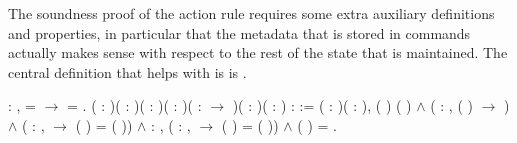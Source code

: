 \documentclass[12pt]{report}
\begin{document}
 The soundness proof of the action rule requires some
    extra auxiliary definitions and properties, in particular
    that the metadata that is stored in  commands
    actually makes sense with respect to the rest of the
    state that is maintained. The central definition that helps
    with is is . \begin{coqdoccode}
\coqdocemptyline
\coqdocnoindent
{}  :\coqdoceol
\coqdocindent{1.00em}
\coqdockw{\ensuremath{\forall}} ,   =  \ensuremath{\rightarrow}   = .\coqdoceol
 \coqdocemptyline
\coqdocnoindent
{}  ( : )( : )( : )( :  )( :  \ensuremath{\rightarrow} )(  : )( : ) :  :=\coqdoceol
\coqdocindent{1.00em}
\coqdoceol
\coqdocindent{1.00em}
\coqdoctac{\ensuremath{\exists}} ( : )( : ),\coqdoceol
\coqdocindent{2.00em}
 ( ) (    ) \ensuremath{\land}\coqdoceol
\coqdocindent{1.00em}
\coqdoceol
\coqdocindent{2.00em}
(\coqdockw{\ensuremath{\forall}}  : ,   (  ) \ensuremath{\rightarrow}   ) \ensuremath{\land}\coqdoceol
\coqdocindent{1.00em}
\coqdoceol
\coqdocindent{2.00em}
(\coqdockw{\ensuremath{\forall}}  : ,    \ensuremath{\rightarrow}  ( ) =  ( )) \ensuremath{\land}\coqdoceol
\coqdocindent{1.00em}
\coqdoceol
\coqdocindent{2.00em}
\coqdoctac{\ensuremath{\exists}}  : ,\coqdoceol
\coqdocindent{3.00em}
(\coqdockw{\ensuremath{\forall}}  : ,    \ensuremath{\rightarrow}  ( ) =  ( )) \ensuremath{\land}\coqdoceol
\coqdocindent{4.00em}
 (  )  = .\coqdoceol

\end{coqdoccode}
\end{document}
